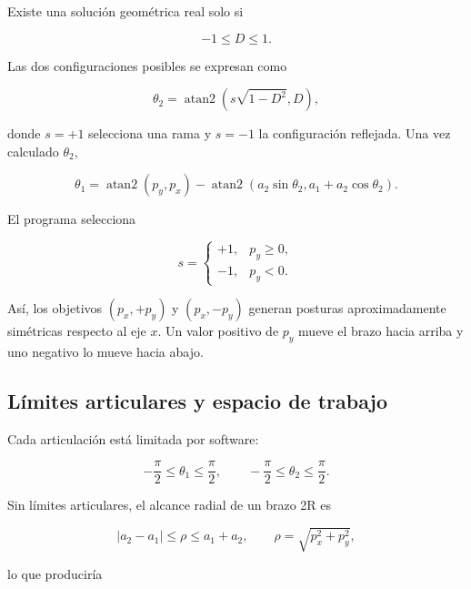 \documentclass[11pt,a4paper]{article}
\begin{document}
Existe una solución geométrica real solo si

\begin{equation}
-1\leq D\leq 1.
\end{equation}

Las dos configuraciones posibles se expresan como

\begin{equation}
\theta_2=\operatorname{atan2}\left(s\sqrt{1-D^2},D\right),
\label{eq:theta2}
\end{equation}

donde $s=+1$ selecciona una rama y $s=-1$ la configuración reflejada. Una vez calculado $\theta_2$,

\begin{equation}
\theta_1=\operatorname{atan2}(p_y,p_x)-
\operatorname{atan2}\left(a_2\sin\theta_2,
a_1+a_2\cos\theta_2\right).
\label{eq:theta1}
\end{equation}

El programa selecciona

\begin{equation}
s=\begin{cases}
+1,&p_y\geq 0,\\
-1,&p_y<0.
\end{cases}
\end{equation}

Así, los objetivos $(p_x,+p_y)$ y $(p_x,-p_y)$ generan posturas aproximadamente simétricas respecto al eje $x$. Un valor positivo de $p_y$ mueve el brazo hacia arriba y uno negativo lo mueve hacia abajo.

\subsection{Límites articulares y espacio de trabajo}

Cada articulación está limitada por software:

\begin{equation}
-\frac{\pi}{2}\leq\theta_1\leq\frac{\pi}{2},
\qquad
-\frac{\pi}{2}\leq\theta_2\leq\frac{\pi}{2}.
\label{eq:limits}
\end{equation}

Sin límites articulares, el alcance radial de un brazo 2R es

\begin{equation}
|a_2-a_1|\leq \rho \leq a_1+a_2,
\qquad \rho=\sqrt{p_x^2+p_y^2},
\end{equation}

lo que produciría
\end{document}
